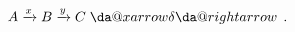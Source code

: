 \documentclass[preview]{standalone}
\makeatletter
\newcommand*{\xdashrightarrow}[2][]{
                                     \mathrel{
                                       \mathpalette{\da@xarrow{#1}{#2}{}\da@rightarrow{\,}{}}{}%
                                     }
                                   }
\makeatother
\begin{document}
\begin{center}
$A\xrightarrow{x}B\xrightarrow{y}C\xdashrightarrow{\delta}.$
\end{center}
\end{document}

